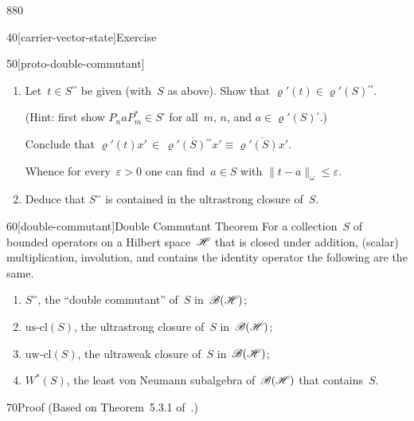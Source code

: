 \begin{parsec}{880}
\begin{point}{40}[carrier-vector-state]{Exercise}
\begin{point}{50}[proto-double-commutant]
\begin{enumerate}
Prove that $\varrho'(t)=\sum_n P_n^* t P_n$,
where $P_n:=\pi_n\colon \scrH'\equiv \bigoplus_n\scrH\to\scrH$
is the $n$-th projection.
\item

Let~$t\in S^{\square\square}$ be given
(with~$S$ as above).
Show that $\varrho'(t)\in \varrho'(S)^{\square\square}$.

(Hint: first show 
	$P_n aP_m^*\in S^\square$ for all~$m$, $n$, and
		$a\in \varrho'(S)^\square$.)

Conclude that  $\varrho'(t)x'\,\in\,\overline{\varrho'(S)^{\square\square}x'}
\equiv \overline{\varrho'(S)x'}$.

Whence for every~$\varepsilon>0$
one can find~$a\in S$ with $\|t-a\|_\omega \leq \varepsilon$.

\item
Deduce that $S^{\square\square}$
is contained in the ultrastrong closure of~$S$.
\end{enumerate}
\spacingfix
\end{point}%
\end{point}%
\begin{point}{60}[double-commutant]{Double Commutant Theorem}%
%
For a collection~$S$ of bounded operators
on a Hilbert space~$\mathscr{H}$
that is closed under addition, (scalar) multiplication,
involution, and contains the identity operator
the following are the same.
\begin{enumerate}
\item
$S^{\square\square}$, the ``double commutant'' of~$S$
in~$\mathscr{B}(\mathscr{H})$;
\item
$\mathrm{us}\text{-}\mathrm{cl}(S)$,
the ultrastrong closure of~$S$ in~$\mathscr{B}(\mathscr{H})$;
\item
$\mathrm{uw}\text{-}\mathrm{cl}(S)$,
the ultraweak closure of~$S$ in~$\mathscr{B}(\mathscr{H})$;
\item
$W^*(S)$,
the least von Neumann subalgebra of~$\mathscr{B}(\mathscr{H})$
that contains~$S$.
\end{enumerate}
\begin{point}{70}{Proof}%
(Based on Theorem~5.3.1 of~\cite{kr}.) 


\end{point}
\end{point}
\end{parsec}

